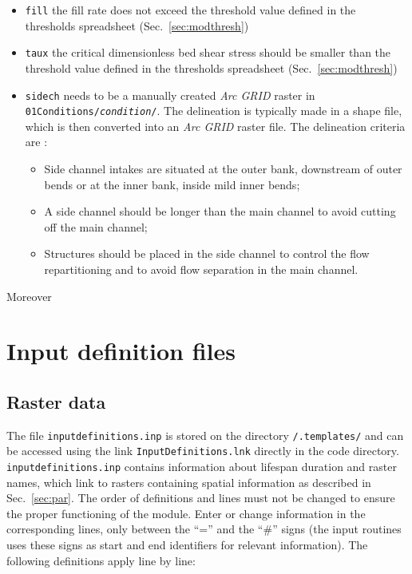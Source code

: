 \begin{itemize}
	\item \texttt{fill} the fill rate does not exceed the threshold value defined in the thresholds spreadsheet (Sec.~\ref{sec:modthresh})
	\item \texttt{taux} the critical dimensionless bed shear stress should be smaller than the threshold value defined in the thresholds spreadsheet (Sec.~\ref{sec:modthresh})
	\item \texttt{sidech} needs to be a manually created \textit{Arc GRID} raster in \texttt{01{\myUnderscore}Conditions/\textit{condition}/}. The delineation is typically made in a shape file, which is then converted into an \textit{Arc GRID} raster file. The delineation criteria are \citep{vandenderen17}:
	\begin{itemize}
		\item Side channel intakes are situated at the outer bank, downstream of outer bends or at the inner bank, inside mild inner bends;
		\item A side channel should be longer than the main channel to avoid cutting off the main channel;
		\item Structures should be placed in the side channel to control the flow repartitioning and to avoid flow separation in the main channel.
	\end{itemize}
\end{itemize}
Moreover


\section{Input definition files}\label{sec:inp}
\subsection{Raster data}\label{sec:inpfile}

The file \texttt{input{\myUnderscore}definitions.inp} is stored on the directory \texttt{/.templates/} and can be accessed using the link \texttt{InputDefinitions.lnk} directly in the code directory. \texttt{input{\myUnderscore}definitions.inp} contains information about lifespan duration and raster names, which link to rasters containing spatial information as described in Sec.~\ref{sec:par}. The order of definitions and lines must not be changed to ensure the proper functioning of the module. Enter or change information in the corresponding lines, only between the ``='' and the ``$\#$'' signs (the input routines uses these signs as start and end identifiers for relevant information). The following definitions apply line by line:\\

